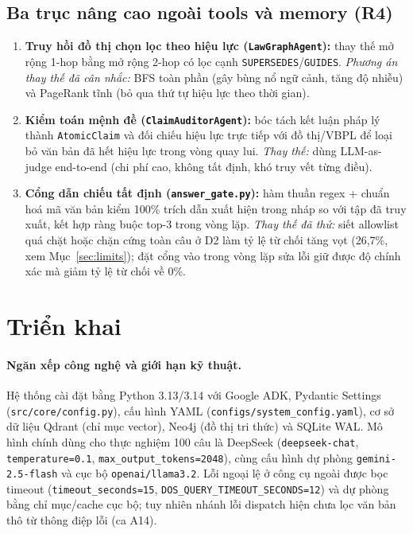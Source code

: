 \documentclass[sigconf,nonacm]{acmart}
\begin{document}
\subsection{Ba trục nâng cao ngoài tools và memory (R4)}
\begin{enumerate}[leftmargin=*]
  \item \textbf{Truy hồi đồ thị chọn lọc theo hiệu lực (\texttt{LawGraphAgent}):} thay thế mở rộng 1-hop bằng mở rộng 2-hop có lọc cạnh \texttt{SUPERSEDES}/\texttt{GUIDES}. \emph{Phương án thay thế đã cân nhắc:} BFS toàn phần (gây bùng nổ ngữ cảnh, tăng độ nhiễu) và PageRank tĩnh (bỏ qua thứ tự hiệu lực theo thời gian).
  \item \textbf{Kiểm toán mệnh đề (\texttt{ClaimAuditorAgent}):} bóc tách kết luận pháp lý thành \texttt{AtomicClaim} và đối chiếu hiệu lực trực tiếp với đồ thị/VBPL để loại bỏ văn bản đã hết hiệu lực trong vòng quay lui. \emph{Thay thế:} dùng LLM-as-judge end-to-end (chi phí cao, không tất định, khó truy vết từng điều).
  \item \textbf{Cổng dẫn chiếu tất định (\texttt{answer\_gate.py}):} hàm thuần regex + chuẩn hoá mã văn bản kiểm 100\% trích dẫn xuất hiện trong nháp so với tập đã truy xuất, kết hợp ràng buộc top-3 trong vòng lặp. \emph{Thay thế đã thử:} siết allowlist quá chặt hoặc chặn cứng toàn câu ở D2 làm tỷ lệ từ chối tăng vọt (26,7\%, xem Mục~\ref{sec:limits}); đặt cổng vào trong vòng lặp sửa lỗi giữ được độ chính xác mà giảm tỷ lệ từ chối về 0\%.
\end{enumerate}

\section{Triển khai}
\label{sec:impl}

\paragraph{Ngăn xếp công nghệ và giới hạn kỹ thuật.}
Hệ thống cài đặt bằng Python 3.13/3.14 với Google ADK, Pydantic Settings (\texttt{src/core/config.py}), cấu hình YAML (\texttt{configs/system\_config.yaml}), cơ sở dữ liệu Qdrant (chỉ mục vector), Neo4j (đồ thị tri thức) và SQLite WAL. Mô hình chính dùng cho thực nghiệm 100 câu là DeepSeek (\texttt{deepseek-chat}, \texttt{temperature=0.1}, \texttt{max\_output\_tokens=2048}), cùng cấu hình dự phòng \texttt{gemini-2.5-flash} và cục bộ \texttt{openai/llama3.2}. Lỗi ngoại lệ ở công cụ ngoài được bọc timeout (\texttt{timeout\_seconds=15}, \texttt{DOS\_QUERY\_TIMEOUT\_SECONDS=12}) và dự phòng bằng chỉ mục/cache cục bộ; tuy nhiên nhánh lỗi dispatch hiện chưa lọc văn bản thô từ thông điệp lỗi (ca A14).
\end{document}
